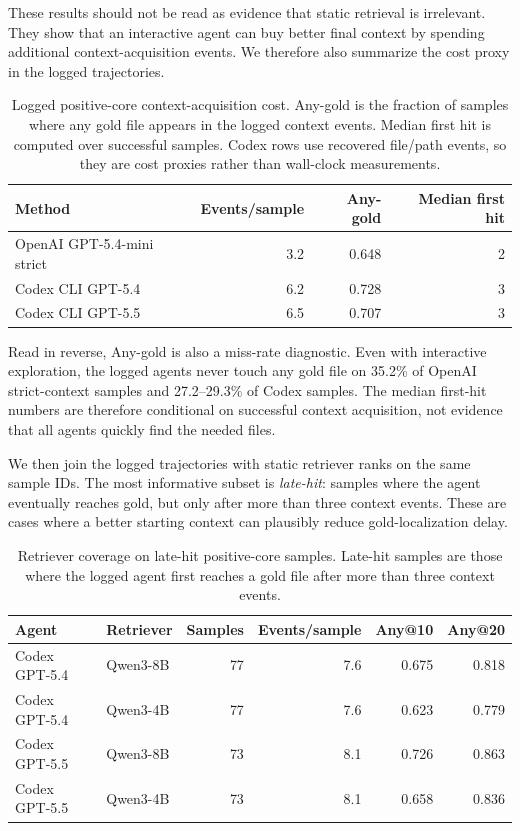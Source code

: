 \documentclass[11pt]{article}
\begin{document}
These results should not be read as evidence that static retrieval is irrelevant. They show that an interactive agent can buy better final context by spending additional context-acquisition events. We therefore also summarize the cost proxy in the logged trajectories.

\begin{table}[t]
\centering
\caption{Logged positive-core context-acquisition cost. Any-gold is the fraction of samples where any gold file appears in the logged context events. Median first hit is computed over successful samples. Codex rows use recovered file/path events, so they are cost proxies rather than wall-clock measurements.}
\label{tab:trajectory-cost}
\begin{tabular}{lrrr}
\toprule
Method & Events/sample & Any-gold & Median first hit \\
\midrule
OpenAI GPT-5.4-mini strict & 3.2 & 0.648 & 2 \\
Codex CLI GPT-5.4 & 6.2 & 0.728 & 3 \\
Codex CLI GPT-5.5 & 6.5 & 0.707 & 3 \\
\bottomrule
\end{tabular}
\end{table}

Read in reverse, Any-gold is also a miss-rate diagnostic. Even with interactive exploration, the logged agents never touch any gold file on 35.2\% of OpenAI strict-context samples and 27.2--29.3\% of Codex samples. The median first-hit numbers are therefore conditional on successful context acquisition, not evidence that all agents quickly find the needed files.

We then join the logged trajectories with static retriever ranks on the same sample IDs. The most informative subset is \emph{late-hit}: samples where the agent eventually reaches gold, but only after more than three context events. These are cases where a better starting context can plausibly reduce gold-localization delay.

\begin{table}[t]
\centering
\caption{Retriever coverage on late-hit positive-core samples. Late-hit samples are those where the logged agent first reaches a gold file after more than three context events.}
\label{tab:late-hit-join}
\begin{tabular}{llrrrr}
\toprule
Agent & Retriever & Samples & Events/sample & Any@10 & Any@20 \\
\midrule
Codex GPT-5.4 & Qwen3-8B & 77 & 7.6 & 0.675 & 0.818 \\
Codex GPT-5.4 & Qwen3-4B & 77 & 7.6 & 0.623 & 0.779 \\
Codex GPT-5.5 & Qwen3-8B & 73 & 8.1 & 0.726 & 0.863 \\
Codex GPT-5.5 & Qwen3-4B & 73 & 8.1 & 0.658 & 0.836 \\
\bottomrule
\end{tabular}
\end{table}
\end{document}

